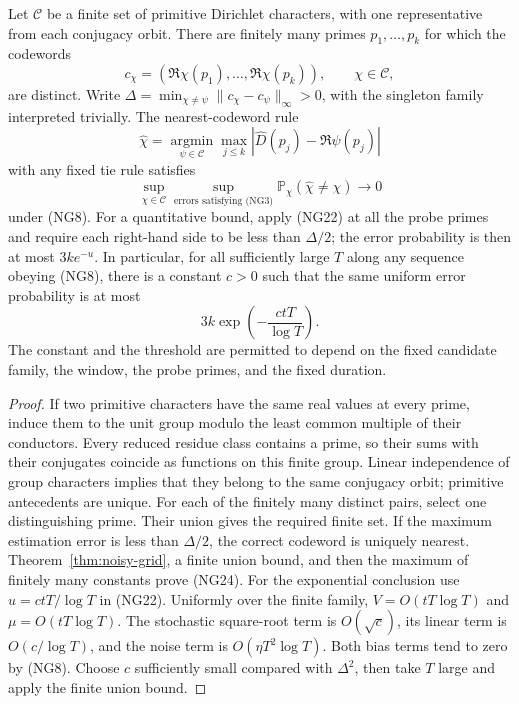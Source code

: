\begin{theorem}
\label{thm:finite-family}
Let $\mathcal C$ be a finite set of primitive Dirichlet characters, with
one representative from each conjugacy orbit.  There are finitely many
primes $p_1,\ldots,p_k$ for which the codewords
\[
 c_\chi=(\Re\chi(p_1),\ldots,\Re\chi(p_k)),\qquad\chi\in\mathcal C,
\]
are distinct.  Write $\Delta=\min_{\chi\ne\psi}\|c_\chi-c_\psi\|_\infty>0$,
with the singleton family interpreted trivially.  The nearest-codeword
rule
\[
 \widehat\chi=\operatorname*{argmin}_{\psi\in\mathcal C}
          \max_{j\le k}|\widehat D(p_j)-\Re\psi(p_j)|       \tag{NG23}
\]
with any fixed tie rule satisfies
\[
 \sup_{\chi\in\mathcal C}\sup_{\text{errors satisfying (NG3)}}
        \mathbb P_\chi(\widehat\chi\ne\chi)\longrightarrow0
                                                               \tag{NG24}
\]
under (NG8).  For a quantitative bound, apply (NG22) at all the probe
primes and require each right-hand side to be less than $\Delta/2$;
the error probability is then at most $3ke^{-u}$.
In particular, for all sufficiently large $T$ along any sequence obeying
(NG8), there is a constant $c>0$ such that the same uniform error
probability is at most
\[
             3k\exp\!\left(-\frac{ctT}{\log T}\right).     \tag{NG24a}
\]
The constant and the threshold are permitted to depend on the fixed
candidate family, the window, the probe primes, and the fixed duration.
\end{theorem}

\begin{proof}
If two primitive characters have the same real values at every prime,
induce them to the unit group modulo the least common multiple of their
conductors.  Every reduced residue class contains a prime, so their sums
with their conjugates coincide as functions on this finite group.
Linear independence of group characters implies that they belong to the
same conjugacy orbit; primitive antecedents are unique.  For each of the
finitely many distinct pairs, select one distinguishing prime.  Their
union gives the required finite set.  If the maximum estimation error is
less than $\Delta/2$, the correct codeword is uniquely nearest.
Theorem~\ref{thm:noisy-grid}, a finite union bound, and then the maximum of
finitely many constants prove (NG24).
For the exponential conclusion use $u=ctT/\log T$ in (NG22).
Uniformly over the finite family, $V=O(tT\log T)$ and
$\mu=O(tT\log T)$. The stochastic square-root term is $O(\sqrt c)$,
its linear term is $O(c/\log T)$, and the noise term is
$O(\eta T^2\log T)$. Both bias terms tend to zero by (NG8).
Choose $c$ sufficiently small compared with $\Delta^2$, then take $T$
large and apply the finite union bound.
\end{proof}

